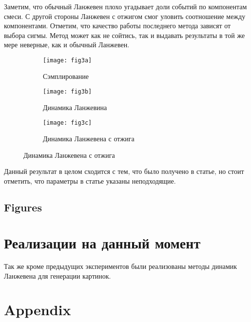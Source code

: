 \documentclass{article}
\begin{document}
Заметим, что обычный Ланжевен плохо угадывает доли событий по компонентам смеси. С другой стороны Ланжевен с отжигом смог уловить соотношение между компонентами. Отметим, что качество работы последнего метода зависят от выбора сигмы. Метод может как не сойтись, так и выдавать результаты в той же мере неверные, как и обычный Ланжевен.


\begin{figure}[H]
	\centering
	\begin{subfigure}[b]{0.4\textwidth}
		\texttt{[image: fig3a]}
		\caption{Сэмплирование}
		\label{fig:3a}
	\end{subfigure}
	\begin{subfigure}[b]{0.4\textwidth}
		\texttt{[image: fig3b]}
		\caption{Динамика Ланжевина}
		\label{fig:3b}
	\end{subfigure}
	\begin{subfigure}[b]{0.4\textwidth}
		\texttt{[image: fig3c]}
		\caption{Динамика Ланжевена с отжига}
		\label{fig:3c}
	\end{subfigure}
\end{figure}

Данный результат в целом сходится с тем, что было получено в статье, но стоит отметить, что параметры в статье указаны неподходящие.

\subsection{Figures}

\section{Реализации на данный момент}

Так же кроме предыдущих экспериментов были реализованы методы динамик Ланжевена для генерации картинок.



 
 

\section{Appendix}
\end{document}
